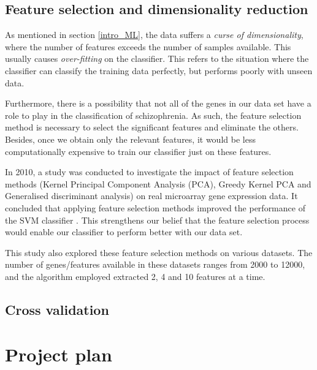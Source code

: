 \documentclass[12pt, twoside, a4paper]{article}
\begin{document}
\subsection{Feature selection and dimensionality reduction} \label{bg_feature_selection}
As mentioned in section \ref{intro_ML}, the data suffers a \textit{curse of dimensionality}, where the number of features exceeds the number of samples available. This usually causes \textit{over-fitting} on the classifier. This refers to the situation where the classifier can classify the training data perfectly, but performs poorly with unseen data.

Furthermore, there is a possibility that not all of the genes in our data set have a role to play in the classification of schizophrenia. As such, the feature selection method is necessary to select the significant features and eliminate the others. Besides, once we obtain only the relevant features, it would be less computationally expensive to train our classifier just on these features.

In 2010, a study was conducted to investigate the impact of feature selection methods (Kernel Principal Component Analysis (PCA), Greedy Kernel PCA and Generalised discriminant analysis) on real microarray gene expression data. It concluded that applying feature selection methods improved the performance of the SVM classifier \cite{RefWorks:115}. This strengthens our belief that the feature selection process would enable our classifier to perform better with our data set.

This study also explored these feature selection methods on various datasets. The number of genes/features available in these datasets ranges from 2000 to 12000, and the algorithm employed extracted 2, 4 and 10 features at a time.


\subsection{Cross validation}

\newpage

\section{Project plan}

\end{document}
